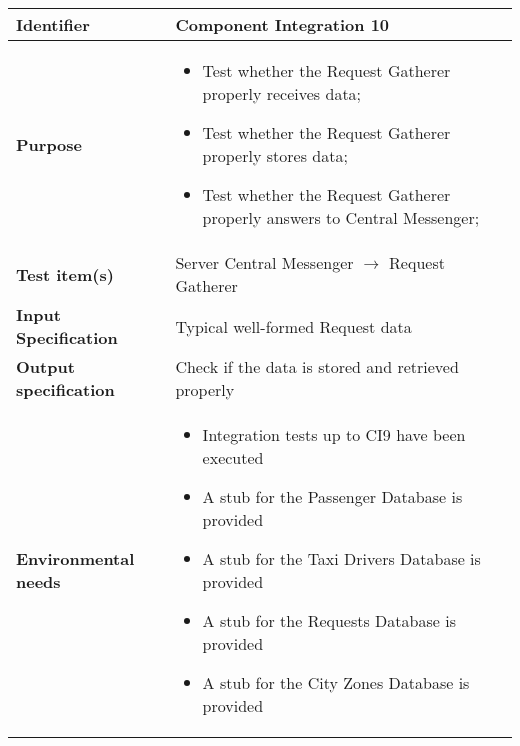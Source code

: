 \begin{center}
\begin{tabular}{lp{}}
\toprule
\textbf{Identifier}		&	Component Integration 10\\
\midrule
\textbf{Purpose}		&	\begin{itemize}
					\item Test whether the Request Gatherer properly receives data;
					\item Test whether the Request Gatherer properly stores data; 
					\item Test whether the Request Gatherer properly answers to Central Messenger;
					\end{itemize}	\\
\textbf{Test item(s)}	&	Server Central Messenger $\rightarrow$ Request Gatherer\\
\textbf{Input Specification}	&	Typical well-formed Request data\\
\textbf{Output specification}	&	Check if the data is stored and retrieved properly\\
\textbf{Environmental needs}	&	\begin{itemize}
							\item Integration tests up to CI9 have been executed
							\item A stub for the Passenger Database is provided
							\item A stub for the Taxi Drivers Database is provided
							\item A stub for the Requests Database is provided
							\item A stub for the City Zones Database is provided
							\end{itemize}	\\
\bottomrule
\end{tabular}
\end{center}




